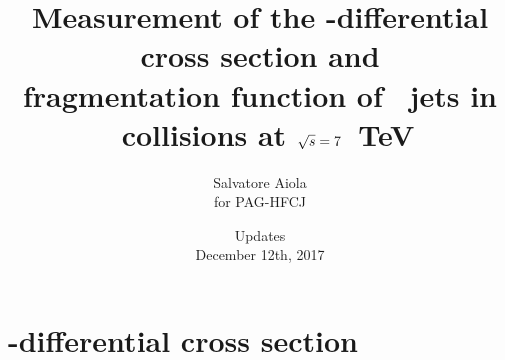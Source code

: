 \documentclass[xcolor={usenames,dvipsnames}, aspectratio=169]{beamer}
\title[D-Tagged Jets in \pp] %
{Measurement of the \pt-differential cross section and \\ fragmentation function of \Dzero\ jets in \pp\ collisions at $\sqrt{s}=7$~TeV}
\author[Salvatore Aiola]%
{Salvatore Aiola \\
for PAG-HFCJ}
\institute[Yale University] %
{Yale University}
\date[Dec. 12th, 2017] %
{Updates \\
December 12th, 2017}
\begin{document}
\begin{frame}
  \titlepage
\end{frame}








\section{\pt-differential cross section}
\end{document}
